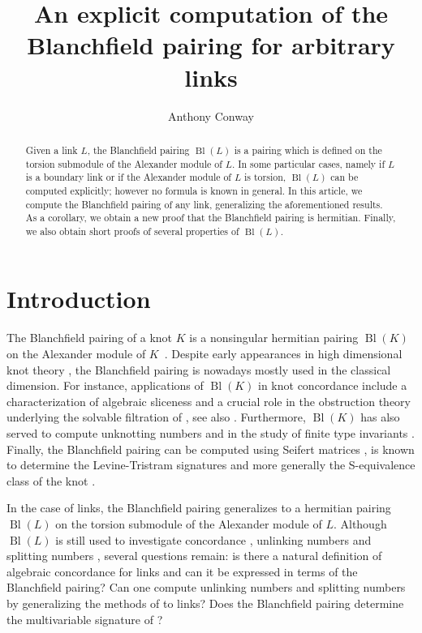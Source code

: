 \documentclass[11pt,a4paper]{amsart}
\theoremstyle{definition}
\def\op{\operatorname}
\begin{document}
\title{An explicit computation of the Blanchfield pairing for arbitrary links}
\author{Anthony Conway}
\address{Universit\'e de Gen\`eve, Section de math\'ematiques, 2-4 rue du Li\`evre, 1211 Gen\`eve 4, Switzerland}
\maketitle
\begin{abstract}
Given a link $L$, the Blanchfield pairing $\op{Bl}(L)$ is a pairing which is defined on the torsion submodule of the Alexander module of $L$. In some particular cases, namely if $L$ is a boundary link or if the Alexander module of $L$ is torsion, $\op{Bl}(L)$ can be computed explicitly; however no formula is known in general. In this article, we compute the Blanchfield pairing of any link, generalizing the aforementioned results. As a corollary, we obtain a new proof that the Blanchfield pairing is hermitian. Finally, we also obtain short proofs of several properties of $\op{Bl}(L)$.
\end{abstract}


\section{Introduction}
The Blanchfield pairing of a knot $K$ is a nonsingular hermitian pairing $\op{Bl}(K)$ on the Alexander module of $K$~\cite{Blanchfield}. Despite early appearances in high dimensional knot theory \cite{KeartonSimple, KeartonSimple2, Ranicki}, the Blanchfield pairing is nowadays mostly used in the classical dimension. For instance, applications of $\op{Bl}(K)$ in knot concordance include a characterization of algebraic sliceness \cite{KeartonCobordism} and a crucial role in the obstruction theory underlying the solvable filtration of \cite{CochranOrrTeichner}, see also \cite{ChaMinimal, CochranHarveyLeidyKnot, FriedlTeichner, Letsche, Litherland}. Furthermore, $\op{Bl}(K)$  has also served to compute unknotting numbers \cite{BorodzikFriedl0, BorodzikFriedl2, BorodzikFriedl} and in the study of finite type invariants \cite{Moussard}. Finally, the Blanchfield pairing can be computed using Seifert matrices \cite{FriedlPowell,KeartonCobordism,Levine}, is known to determine the Levine-Tristram signatures \cite{BorodzikFriedl} and more generally the S-equivalence class of the knot \cite{Trotter}.

In the case of links, the Blanchfield pairing generalizes to a hermitian pairing $\op{Bl}(L)$ on the torsion submodule of the Alexander module of $L$. Although $\op{Bl}(L)$ is still used to investigate concordance \cite{ChaSymmetric,  CochranHarveyLeidy, CochranOrrNotAll, Duval, KimWhitney, Sheiham}, unlinking numbers and splitting numbers \cite{BorodzikFriedlPowell}, several questions remain: is there a natural definition of algebraic concordance for links and can it be expressed in terms of the Blanchfield pairing? Can one compute unlinking numbers and splitting numbers by generalizing the methods of \cite{BorodzikFriedl0, BorodzikFriedl2, BorodzikFriedl} to links? Does the Blanchfield pairing determine the multivariable signature of \cite{CimasoniFlorens}?
\end{document}
